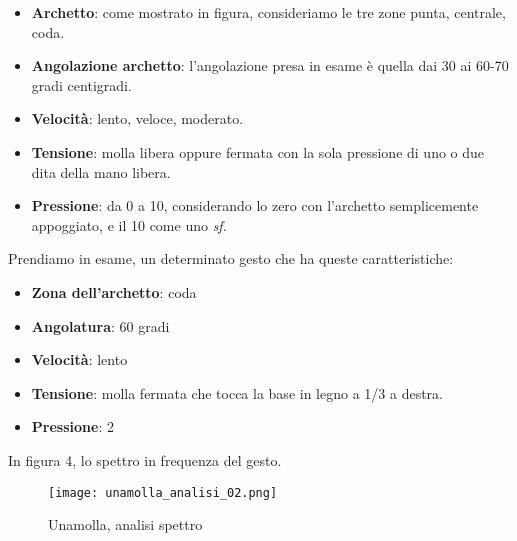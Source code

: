 \begin{itemize}
\item{\textbf{Archetto}: come mostrato in figura, consideriamo le tre zone punta, centrale, coda.}
\item{\textbf{Angolazione archetto}: l’angolazione presa in esame è quella dai 30 ai 60-70 gradi centigradi.}
\item{\textbf{Velocità}: lento, veloce, moderato.}
\item{\textbf{Tensione}: molla libera oppure fermata con la sola pressione di uno o due dita della mano libera.}
\item{\textbf{Pressione}: da 0 a 10, considerando lo zero con l’archetto semplicemente appoggiato, e il 10 come uno \textit{sf}.}
\end{itemize}

Prendiamo in esame, un determinato gesto che ha queste caratteristiche:
\begin{itemize}
\item{\textbf{Zona dell’archetto}: coda}
\item{\textbf{Angolatura}: 60 gradi}
\item{\textbf{Velocità}: lento}
\item{\textbf{Tensione}: molla fermata che tocca la base in legno a 1/3 a destra.}
\item{\textbf{Pressione}: 2}
\end{itemize}

In figura 4, lo spettro in frequenza del gesto. \\
\begin{figure}

\begin{center}

\texttt{[image: unamolla\_analisi\_02.png]}

\caption{Unamolla, analisi spettro}

\label{fig:04_spettro_01}

\end{center}

\end{figure}

